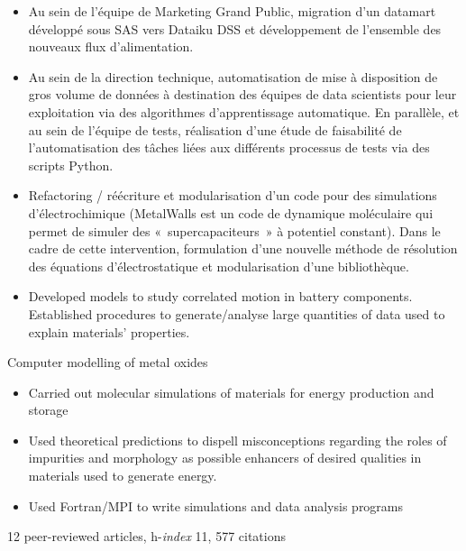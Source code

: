 \documentclass[10pt,a4paper,ragged2e,academicons]{altacv}
\begin{document}
\divider

\begin{itemize}
\item Au sein de l’équipe de Marketing Grand Public, migration d’un datamart développé sous
SAS vers Dataiku DSS et développement de l’ensemble des nouveaux flux d’alimentation. 
\end{itemize}

\divider

\begin{itemize}
\item Au sein de la direction technique, automatisation de mise à disposition de gros volume de
données à destination des équipes de data scientists pour leur exploitation via des
algorithmes d’apprentissage automatique.
En parallèle, et au sein de l’équipe de tests, réalisation d’une étude de faisabilité de
l’automatisation des tâches liées aux différents processus de tests via des scripts Python. 
\end{itemize}

\divider

\begin{itemize}
\item Refactoring / réécriture et modularisation d’un code pour des simulations
d’électrochimique (MetalWalls est un code de dynamique moléculaire qui permet de
simuler des « supercapaciteurs » à potentiel constant).
Dans le cadre de cette intervention, formulation d’une nouvelle méthode de résolution
des équations d’électrostatique et modularisation d'une bibliothèque. 
\end{itemize}

\clearpage
{}

\begin{itemize}
\item Developed models to study correlated motion in
battery components.
Established procedures to generate/analyse large
quantities of data used to explain materials'
properties. 
\end{itemize}

\divider

Computer modelling of metal oxides
\smallskip
\begin{itemize}
\item Carried out molecular simulations of materials for energy production and storage
\item Used theoretical predictions to dispell
misconceptions regarding the roles of impurities
and morphology as possible enhancers of
desired qualities in materials used to generate
energy.
\item Used Fortran/MPI to write simulations and data analysis programs
\end{itemize}
{\small 12 peer-reviewed articles, h-\textit{index} 11, 577 citations}
\end{document}
